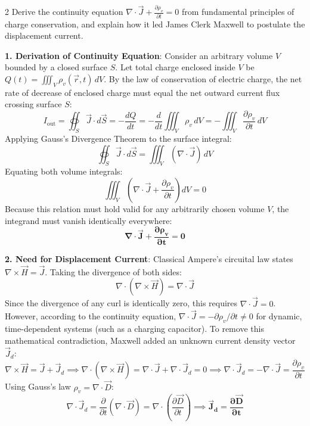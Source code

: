\begin{theoryq}{2}
Derive the continuity equation $\nabla \cdot \vec{J} + \frac{\partial \rho_v}{\partial t} = 0$ from fundamental principles of charge conservation, and explain how it led James Clerk Maxwell to postulate the displacement current.
\end{theoryq}
\begin{theorysol}
\textbf{1. Derivation of Continuity Equation}:
Consider an arbitrary volume $V$ bounded by a closed surface $S$. Let total charge enclosed inside $V$ be $Q(t) = \iiint_V \rho_v(\vec{r},t)\,dV$.
By the law of conservation of electric charge, the net rate of decrease of enclosed charge must equal the net outward current flux crossing surface $S$:
\begin{equation}
I_{\text{out}} = \oiint_S \vec{J}\cdot d\vec{S} = -\frac{dQ}{dt} = -\frac{d}{dt}\iiint_V \rho_v\,dV = -\iiint_V \frac{\partial \rho_v}{\partial t}\,dV
\end{equation}
Applying Gauss's Divergence Theorem to the surface integral:
\begin{equation}
\oiint_S \vec{J}\cdot d\vec{S} = \iiint_V (\nabla \cdot \vec{J})\,dV
\end{equation}
Equating both volume integrals:
\begin{equation}
\iiint_V \left( \nabla \cdot \vec{J} + \frac{\partial \rho_v}{\partial t} \right) dV = 0
\end{equation}
Because this relation must hold valid for any arbitrarily chosen volume $V$, the integrand must vanish identically everywhere:
\begin{equation}
\mathbf{\nabla \cdot \vec{J} + \frac{\partial \rho_v}{\partial t} = 0}
\end{equation}

\textbf{2. Need for Displacement Current}:
Classical Ampere's circuital law states $\nabla \times \vec{H} = \vec{J}$. Taking the divergence of both sides:
\begin{equation}
\nabla \cdot (\nabla \times \vec{H}) = \nabla \cdot \vec{J}
\end{equation}
Since the divergence of any curl is identically zero, this requires $\nabla \cdot \vec{J} = 0$. However, according to the continuity equation, $\nabla \cdot \vec{J} = -\partial\rho_v/\partial t \ne 0$ for dynamic, time-dependent systems (such as a charging capacitor).
To remove this mathematical contradiction, Maxwell added an unknown current density vector $\vec{J}_d$:
\begin{equation}
\nabla \times \vec{H} = \vec{J} + \vec{J}_d \implies \nabla \cdot (\nabla \times \vec{H}) = \nabla \cdot \vec{J} + \nabla \cdot \vec{J}_d = 0 \implies \nabla \cdot \vec{J}_d = -\nabla \cdot \vec{J} = \frac{\partial \rho_v}{\partial t}
\end{equation}
Using Gauss's law $\rho_v = \nabla \cdot \vec{D}$:
\begin{equation}
\nabla \cdot \vec{J}_d = \frac{\partial}{\partial t}(\nabla \cdot \vec{D}) = \nabla \cdot \left( \frac{\partial \vec{D}}{\partial t} \right) \implies \mathbf{\vec{J}_d = \frac{\partial \vec{D}}{\partial t}}
\end{equation}
\end{theorysol}
